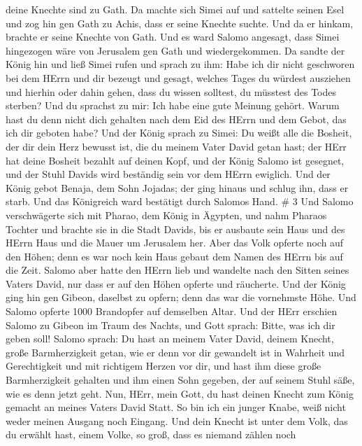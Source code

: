 deine Knechte sind zu Gath.  Da machte sich Simei auf und
sattelte seinen Esel und zog hin gen Gath zu Achis, dass er seine
Knechte suchte. Und da er hinkam, brachte er seine Knechte von Gath.
 Und es ward Salomo angesagt, dass Simei hingezogen wäre
von Jerusalem gen Gath und wiedergekommen.  Da sandte der
König hin und ließ Simei rufen und sprach zu ihm: Habe ich dir nicht
geschworen bei dem HErrn und dir bezeugt und gesagt, welches Tages du
würdest ausziehen und hierhin oder dahin gehen, dass du wissen solltest,
du müsstest des Todes sterben? Und du sprachst zu mir: Ich habe eine
gute Meinung gehört.  Warum hast du denn nicht dich
gehalten nach dem Eid des HErrn und dem Gebot, das ich dir geboten habe?
 Und der König sprach zu Simei: Du weißt alle die Bosheit,
der dir dein Herz bewusst ist, die du meinem Vater David getan hast; der
HErr hat deine Bosheit bezahlt auf deinen Kopf,  und der
König Salomo ist gesegnet, und der Stuhl Davids wird beständig sein vor
dem HErrn ewiglich.  Und der König gebot Benaja, dem Sohn
Jojadas; der ging hinaus und schlug ihn, dass er starb. Und das
Königreich ward bestätigt durch Salomos Hand. \# 3  Und
Salomo verschwägerte sich mit Pharao, dem König in Ägypten, und nahm
Pharaos Tochter und brachte sie in die Stadt Davids, bis er ausbaute
sein Haus und des HErrn Haus und die Mauer um Jerusalem her.
 Aber das Volk opferte noch auf den Höhen; denn es war noch
kein Haus gebaut dem Namen des HErrn bis auf die Zeit. 
Salomo aber hatte den HErrn lieb und wandelte nach den Sitten seines
Vaters David, nur dass er auf den Höhen opferte und räucherte.
 Und der König ging hin gen Gibeon, daselbst zu opfern; denn
das war die vornehmste Höhe. Und Salomo opferte 1000 Brandopfer auf
demselben Altar.  Und der HErr erschien Salomo zu Gibeon im
Traum des Nachts, und Gott sprach: Bitte, was ich dir geben soll!
 Salomo sprach: Du hast an meinem Vater David, deinem
Knecht, große Barmherzigkeit getan, wie er denn vor dir gewandelt ist in
Wahrheit und Gerechtigkeit und mit richtigem Herzen vor dir, und hast
ihm diese große Barmherzigkeit gehalten und ihm einen Sohn gegeben, der
auf seinem Stuhl säße, wie es denn jetzt geht.  Nun, HErr,
mein Gott, du hast deinen Knecht zum König gemacht an meines Vaters
David Statt. So bin ich ein junger Knabe, weiß nicht weder meinen
Ausgang noch Eingang.  Und dein Knecht ist unter dem Volk,
das du erwählt hast, einem Volke, so groß, dass es niemand zählen noch
